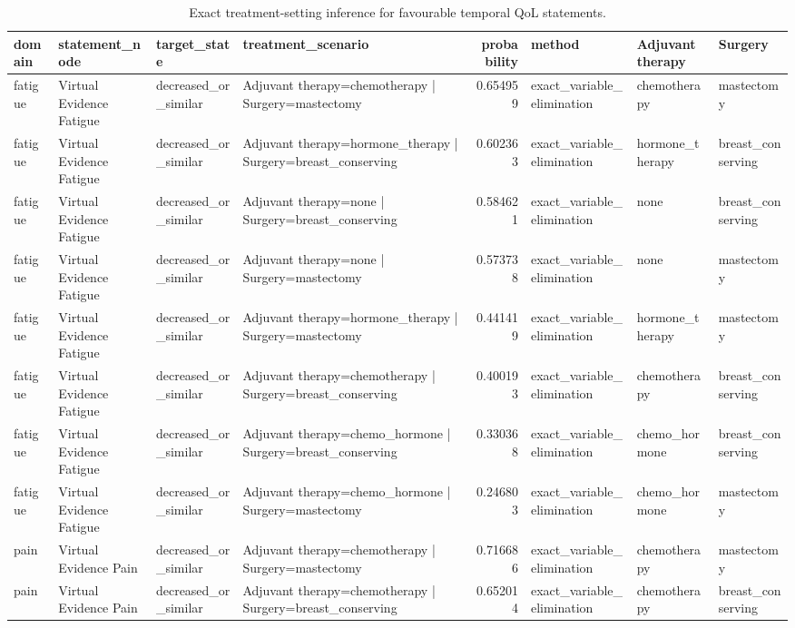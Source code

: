 \begin{table}
\caption{Exact treatment-setting inference for favourable temporal QoL statements.}
\label{tab:inference_favorable}
\begin{tabular}{llllrlll}
\toprule
domain & statement\_node & target\_state & treatment\_scenario & probability & method & Adjuvant therapy & Surgery \\
\midrule
fatigue & Virtual Evidence Fatigue & decreased\_or\_similar & Adjuvant therapy=chemotherapy | Surgery=mastectomy & 0.654959 & exact\_variable\_elimination & chemotherapy & mastectomy \\
fatigue & Virtual Evidence Fatigue & decreased\_or\_similar & Adjuvant therapy=hormone\_therapy | Surgery=breast\_conserving & 0.602363 & exact\_variable\_elimination & hormone\_therapy & breast\_conserving \\
fatigue & Virtual Evidence Fatigue & decreased\_or\_similar & Adjuvant therapy=none | Surgery=breast\_conserving & 0.584621 & exact\_variable\_elimination & none & breast\_conserving \\
fatigue & Virtual Evidence Fatigue & decreased\_or\_similar & Adjuvant therapy=none | Surgery=mastectomy & 0.573738 & exact\_variable\_elimination & none & mastectomy \\
fatigue & Virtual Evidence Fatigue & decreased\_or\_similar & Adjuvant therapy=hormone\_therapy | Surgery=mastectomy & 0.441419 & exact\_variable\_elimination & hormone\_therapy & mastectomy \\
fatigue & Virtual Evidence Fatigue & decreased\_or\_similar & Adjuvant therapy=chemotherapy | Surgery=breast\_conserving & 0.400193 & exact\_variable\_elimination & chemotherapy & breast\_conserving \\
fatigue & Virtual Evidence Fatigue & decreased\_or\_similar & Adjuvant therapy=chemo\_hormone | Surgery=breast\_conserving & 0.330368 & exact\_variable\_elimination & chemo\_hormone & breast\_conserving \\
fatigue & Virtual Evidence Fatigue & decreased\_or\_similar & Adjuvant therapy=chemo\_hormone | Surgery=mastectomy & 0.246803 & exact\_variable\_elimination & chemo\_hormone & mastectomy \\
pain & Virtual Evidence Pain & decreased\_or\_similar & Adjuvant therapy=chemotherapy | Surgery=mastectomy & 0.716686 & exact\_variable\_elimination & chemotherapy & mastectomy \\
pain & Virtual Evidence Pain & decreased\_or\_similar & Adjuvant therapy=chemotherapy | Surgery=breast\_conserving & 0.652014 & exact\_variable\_elimination & chemotherapy & breast\_conserving \\

\end{tabular}
\end{table}
